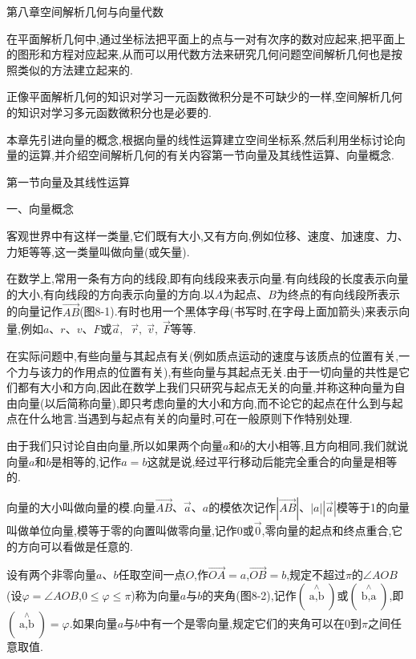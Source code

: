 \documentclass[oneside]{book}
\begin{document}
 
第八章空间解析几何与向量代数

在平面解析几何中,通过坐标法把平面上的点与一对有次序的数对应起来,把平面上的图形和方程对应起来,从而可以用代数方法来研究几何问题空间解析几何也是按照类似的方法建立起来的.

正像平面解析几何的知识对学习一元函数微积分是不可缺少的一样,空间解析几何的知识对学习多元函数微积分也是必要的.

本章先引进向量的概念,根据向量的线性运算建立空间坐标系,然后利用坐标讨论向量的运算,并介绍空间解析几何的有关内容第一节向量及其线性运算、向量概念.

第一节向量及其线性运算

一、向量概念

客观世界中有这样一类量,它们既有大小,又有方向,例如位移、速度、加速度、力、力矩等等,这一类量叫做向量(或矢量).

在数学上,常用一条有方向的线段,即有向线段来表示向量.有向线段的长度表示向量的大小,有向线段的方向表示向量的方向.以$A$为起点、$B$为终点的有向线段所表示的向量记作$\overrightarrow {AB} $(图8-1).有时也用一个黑体字母(书写时,在字母上面加箭头)来表示向量,例如$a$、$r$、$v$、$F$或$\overrightarrow a ,\;\;\overrightarrow r ,\;\overrightarrow v ,\;\overrightarrow F $等等.

在实际问题中,有些向量与其起点有关(例如质点运动的速度与该质点的位置有关,一个力与该力的作用点的位置有关),有些向量与其起点无关.由于一切向量的共性是它们都有大小和方向,因此在数学上我们只研究与起点无关的向量,并称这种向量为自由向量(以后简称向量),即只考虑向量的大小和方向,而不论它的起点在什么到与起点在什么地言.当遇到与起点有关的向量时,可在一般原则下作特别处理.

由于我们只讨论自由向量,所以如果两个向量$a$和$b$的大小相等,且方向相同,我们就说向量$a$和$b$是相等的,记作$a=b$这就是说,经过平行移动后能完全重合的向量是相等的.

向量的大小叫做向量的模.向量$\overrightarrow {AB} $、$\overrightarrow a $、$a$的模依次记作$|\overrightarrow {AB} |$、$|a|$$|\overrightarrow a |$模等于1的向量叫做单位向量,模等于零的向置叫做零向量,记作0或$\overrightarrow 0 $,零向量的起点和终点重合,它的方向可以看做是任意的.

设有两个非零向量$a$、$b$任取空间一点$O$,作$\overrightarrow {OA}  = a$,$\overrightarrow {OB}  = b$,规定不超过$\pi $的$\angle AOB$(设$\varphi  = \angle AOB$,$0 \leqslant \varphi  \leqslant \pi $)称为向量$a$与$b$的夹角(图8-2),记作$(\mathop {a,b}\limits^ \wedge  )$或$(\mathop {b,a}\limits^ \wedge  )$,即$(\mathop {a,b}\limits^ \wedge  ) = \varphi $.如果向量$a$与$b$中有一个是零向量,规定它们的夹角可以在0到$\pi $之间任意取值.
\end{document}
